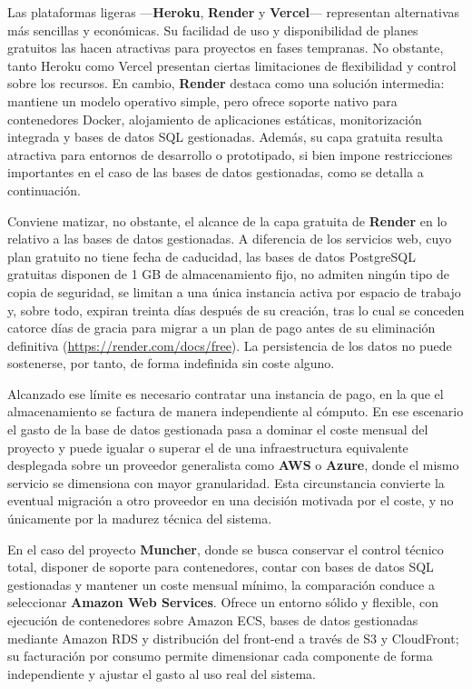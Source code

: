 Las plataformas ligeras —\textbf{Heroku}, \textbf{Render} y \textbf{Vercel}— representan alternativas más sencillas y económicas. Su facilidad de uso y disponibilidad de planes gratuitos las hacen atractivas para proyectos en fases tempranas. No obstante, tanto Heroku como Vercel presentan ciertas limitaciones de flexibilidad y control sobre los recursos. En cambio, \textbf{Render} destaca como una solución intermedia: mantiene un modelo operativo simple, pero ofrece soporte nativo para contenedores Docker, alojamiento de aplicaciones estáticas, monitorización integrada y bases de datos SQL gestionadas. Además, su capa gratuita resulta atractiva para entornos de desarrollo o prototipado, si bien impone restricciones importantes en el caso de las bases de datos gestionadas, como se detalla a continuación.

Conviene matizar, no obstante, el alcance de la capa gratuita de \textbf{Render} en lo relativo a las bases de datos gestionadas. A diferencia de los servicios web, cuyo plan gratuito no tiene fecha de caducidad, las bases de datos PostgreSQL gratuitas disponen de 1 GB de almacenamiento fijo, no admiten ningún tipo de copia de seguridad, se limitan a una única instancia activa por espacio de trabajo y, sobre todo, expiran treinta días después de su creación, tras lo cual se conceden catorce días de gracia para migrar a un plan de pago antes de su eliminación definitiva (\url{https://render.com/docs/free}). La persistencia de los datos no puede sostenerse, por tanto, de forma indefinida sin coste alguno.

Alcanzado ese límite es necesario contratar una instancia de pago, en la que el almacenamiento se factura de manera independiente al cómputo. En ese escenario el gasto de la base de datos gestionada pasa a dominar el coste mensual del proyecto y puede igualar o superar el de una infraestructura equivalente desplegada sobre un proveedor generalista como \textbf{AWS} o \textbf{Azure}, donde el mismo servicio se dimensiona con mayor granularidad. Esta circunstancia convierte la eventual migración a otro proveedor en una decisión motivada por el coste, y no únicamente por la madurez técnica del sistema.

En el caso del proyecto \textbf{Muncher}, donde se busca conservar el control técnico total, disponer de soporte para contenedores, contar con bases de datos SQL gestionadas y mantener un coste mensual mínimo, la comparación conduce a seleccionar \textbf{Amazon Web Services}. Ofrece un entorno sólido y flexible, con ejecución de contenedores sobre Amazon ECS, bases de datos gestionadas mediante Amazon RDS y distribución del front-end a través de S3 y CloudFront; su facturación por consumo permite dimensionar cada componente de forma independiente y ajustar el gasto al uso real del sistema.

